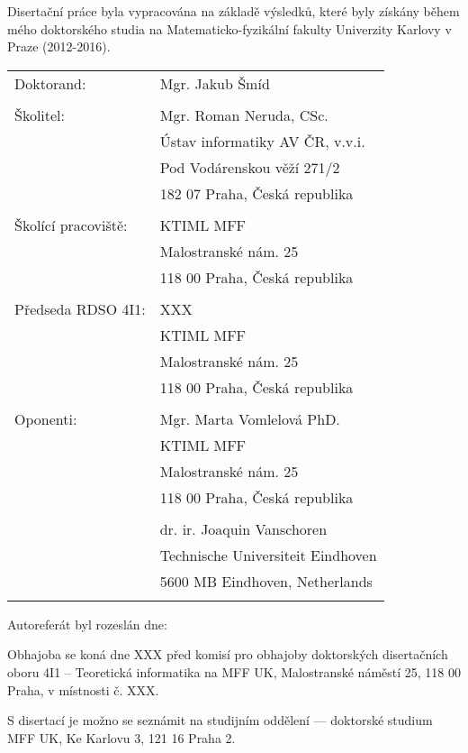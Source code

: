 \documentclass{article}
\begin{document}
\newpage
Disertační práce byla vypracována na základě výsledků, které byly získány během
mého doktorského studia na Matematicko-fyzikální fakulty Univerzity Karlovy v Praze (2012-2016).

\begin{center}
	\begin{tabular}[t]{ll}
		Doktorand: & Mgr. Jakub Šmíd\\
		\\
		Školitel:		&  Mgr. Roman Neruda, CSc.\\
		& Ústav informatiky AV ČR, v.v.i. \\
		& Pod Vodárenskou věží 271/2 \\
		& 182 07 Praha, Česká republika \\
		\\
		Školící pracoviště: & KTIML MFF \\
		& Malostranské nám. 25 \\
		& 118 00 Praha, Česká republika	\\
		\\
		Předseda RDSO 4I1: 	& XXX \\
		& KTIML MFF \\
		& Malostranské nám. 25 \\
		& 118 00 Praha, Česká republika \\
		\\
		Oponenti: 			& Mgr. Marta Vomlelová PhD. \\
		& KTIML MFF \\
		& Malostranské nám. 25 \\
		& 118 00 Praha, Česká republika		\\
		\\
		& dr. ir. Joaquin Vanschoren \\
		& Technische Universiteit Eindhoven \\
		& 5600 MB Eindhoven, Netherlands \\
		\\		
	\end{tabular}	
\end{center}
Autoreferát byl rozeslán dne:
\newline

Obhajoba se koná dne XXX před komisí pro obhajoby doktorských
disertačních oboru 4I1 -- Teoretická informatika na MFF UK, Malostranské
náměstí 25, 118 00 Praha, v místnosti č. XXX. 

S disertací je možno se seznámit na studijním oddělení — doktorské studium
MFF UK, Ke Karlovu 3, 121 16 Praha 2.
\end{document}
